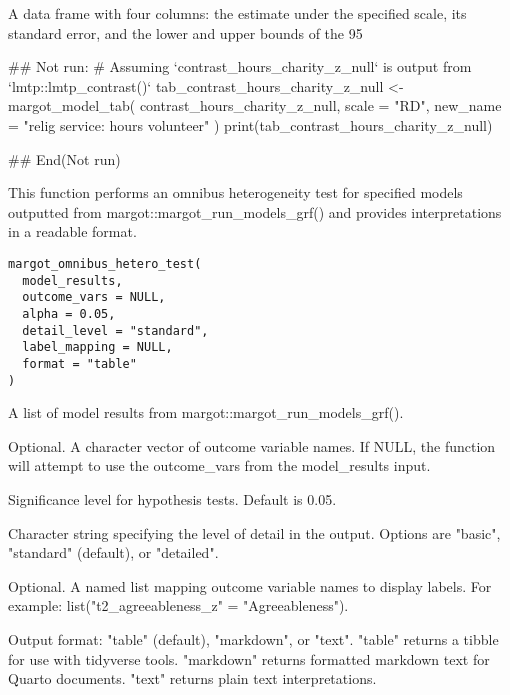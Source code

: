 \documentclass[a4paper]{book}
\begin{document}
%
\begin{Value}
A data frame with four columns: the estimate under the specified scale, its standard error, and
the lower and upper bounds of the 95
\end{Value}
%
\begin{Examples}
\begin{ExampleCode}
## Not run: 
# Assuming `contrast_hours_charity_z_null` is output from `lmtp::lmtp_contrast()`
tab_contrast_hours_charity_z_null <- margot_model_tab(
  contrast_hours_charity_z_null,
  scale = "RD",
  new_name = "relig service: hours volunteer"
)
print(tab_contrast_hours_charity_z_null)

## End(Not run)
\end{ExampleCode}
\end{Examples}
%
\begin{Description}
This function performs an omnibus heterogeneity test for specified models
outputted from margot::margot\_run\_models\_grf() and provides interpretations in a readable format.
\end{Description}
%
\begin{Usage}
\begin{verbatim}
margot_omnibus_hetero_test(
  model_results,
  outcome_vars = NULL,
  alpha = 0.05,
  detail_level = "standard",
  label_mapping = NULL,
  format = "table"
)
\end{verbatim}
\end{Usage}
%
\begin{Arguments}
\begin{ldescription}
\item[\code{model\_results}] A list of model results from margot::margot\_run\_models\_grf().

\item[\code{outcome\_vars}] Optional. A character vector of outcome variable names. If NULL,
the function will attempt to use the outcome\_vars from the model\_results input.

\item[\code{alpha}] Significance level for hypothesis tests. Default is 0.05.

\item[\code{detail\_level}] Character string specifying the level of detail in the output.
Options are "basic", "standard" (default), or "detailed".

\item[\code{label\_mapping}] Optional. A named list mapping outcome variable names to display labels.
For example: list("t2\_agreeableness\_z" = "Agreeableness").

\item[\code{format}] Output format: "table" (default), "markdown", or "text".
"table" returns a tibble for use with tidyverse tools.
"markdown" returns formatted markdown text for Quarto documents.
"text" returns plain text interpretations.
\end{ldescription}
\end{Arguments}
\end{document}
